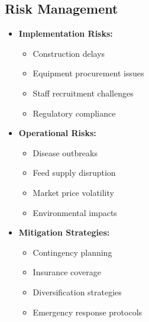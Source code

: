 \subsection{Risk Management}
\begin{itemize}
    \item \textbf{Implementation Risks:}
    \begin{itemize}
        \item Construction delays
        \item Equipment procurement issues
        \item Staff recruitment challenges
        \item Regulatory compliance
    \end{itemize}
    
    \item \textbf{Operational Risks:}
    \begin{itemize}
        \item Disease outbreaks
        \item Feed supply disruption
        \item Market price volatility
        \item Environmental impacts
    \end{itemize}
    
    \item \textbf{Mitigation Strategies:}
    \begin{itemize}
        \item Contingency planning
        \item Insurance coverage
        \item Diversification strategies
        \item Emergency response protocols
    \end{itemize}
\end{itemize}

